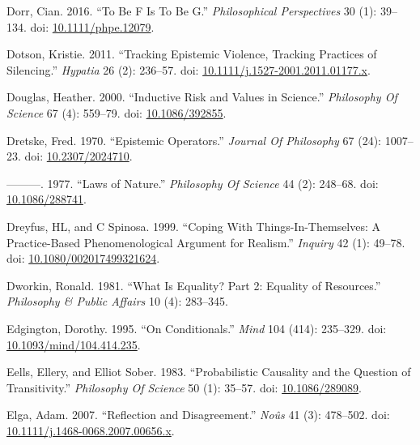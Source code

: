 \documentclass[
  10pt,
  letterpaper,
  DIV=11,
  numbers=noendperiod,
  twoside]{scrartcl}
\newlength{\cslhangindent}
\newenvironment{CSLReferences}[2] %
 {\begin{list}{}{%
  \setlength{\itemindent}{0pt}
  \setlength{\leftmargin}{0pt}
  \setlength{\parsep}{0pt}
  \ifodd #1
   \setlength{\leftmargin}{\cslhangindent}
   \setlength{\itemindent}{-1\cslhangindent}
  \fi
  \setlength{\itemsep}{#2\baselineskip}}}
 {\end{list}}
\begin{document}
\begin{CSLReferences}{1}{0}
Dorr, Cian. 2016. {``To Be F Is To Be G.''} \emph{Philosophical
Perspectives} 30 (1): 39--134. doi:
\href{https://doi.org/10.1111/phpe.12079}{10.1111/phpe.12079}.

Dotson, Kristie. 2011. {``Tracking Epistemic Violence, Tracking
Practices of Silencing.''} \emph{Hypatia} 26 (2): 236--57. doi:
\href{https://doi.org/10.1111/j.1527-2001.2011.01177.x}{10.1111/j.1527-2001.2011.01177.x}.

Douglas, Heather. 2000. {``Inductive Risk and Values in Science.''}
\emph{Philosophy Of Science} 67 (4): 559--79. doi:
\href{https://doi.org/10.1086/392855}{10.1086/392855}.

Dretske, Fred. 1970. {``Epistemic Operators.''} \emph{Journal Of
Philosophy} 67 (24): 1007--23. doi:
\href{https://doi.org/10.2307/2024710}{10.2307/2024710}.

---------. 1977. {``Laws of Nature.''} \emph{Philosophy Of Science} 44
(2): 248--68. doi:
\href{https://doi.org/10.1086/288741}{10.1086/288741}.

Dreyfus, HL, and C Spinosa. 1999. {``Coping With Things-In-Themselves: A
Practice-Based Phenomenological Argument for Realism.''} \emph{Inquiry}
42 (1): 49--78. doi:
\href{https://doi.org/10.1080/002017499321624}{10.1080/002017499321624}.

Dworkin, Ronald. 1981. {``What Is Equality? Part 2: Equality of
Resources.''} \emph{Philosophy \& Public Affairs} 10 (4): 283--345.

Edgington, Dorothy. 1995. {``On Conditionals.''} \emph{Mind} 104 (414):
235--329. doi:
\href{https://doi.org/10.1093/mind/104.414.235}{10.1093/mind/104.414.235}.

Eells, Ellery, and Elliot Sober. 1983. {``Probabilistic Causality and
the Question of Transitivity.''} \emph{Philosophy Of Science} 50 (1):
35--57. doi: \href{https://doi.org/10.1086/289089}{10.1086/289089}.

Elga, Adam. 2007. {``Reflection and Disagreement.''} \emph{Noûs} 41 (3):
478--502. doi:
\href{https://doi.org/10.1111/j.1468-0068.2007.00656.x}{10.1111/j.1468-0068.2007.00656.x}.


\end{CSLReferences}
\end{document}
